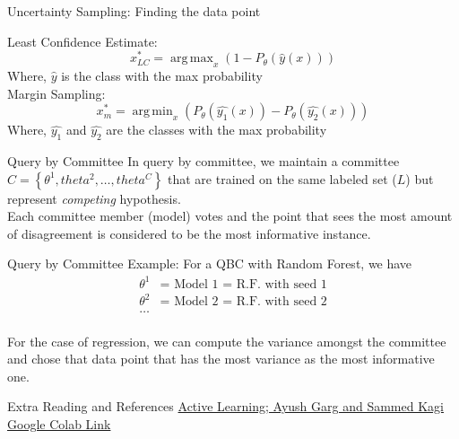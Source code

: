\documentclass{beamer}
\DeclareMathOperator*{\argmin}{arg\,min}
\DeclareMathOperator*{\argmax}{arg\,max}
\begin{document}
\begin{frame}{Uncertainty Sampling: Finding the data point}

Least Confidence Estimate: 
$$
x_{LC}^* = \argmax_{x} \left(1 - P_\theta\left(\hat{y}\left(x\right)\right)\right)
$$
Where, $\hat{y}$ is the class with the max probability
\pause
\bigskip \\
Margin Sampling:
$$
x_{m}^* = \argmin_{x}  \left(P_\theta\left(\hat{y_1}\left(x\right)\right) - P_\theta\left(\hat{y_2}\left(x\right)\right)\right)
$$
Where, $\hat{y_1}$ and $\hat{y_2}$ are the classes with the max probability
\end{frame}

\begin{frame}{Query by Committee}
In query by committee, we maintain a committee $C = \left\lbrace \theta^1, theta^2, \ldots , theta^C \right\rbrace$ that are trained on the same labeled set ($L$) but represent \emph{competing} hypothesis.
\pause \\ \bigskip
Each committee member (model) votes and the point that sees the most amount of disagreement is considered to be the most informative instance. 
\end{frame}

\begin{frame}{Query by Committee}
Example: For a QBC with Random Forest, we have 
\begin{align*}
\theta^1 &= \text{ Model 1 = R.F. with seed 1} \\
\theta^2 &= \text{ Model 2 = R.F. with seed 2} \\
\ldots
\end{align*}
\pause
\\ \bigskip
For the case of regression, we can compute the variance amongst the committee and chose that data point that has the most variance as the most informative one.
\end{frame}

\begin{frame}{Extra Reading and References}
\href{https://sammed98.github.io/Distil_Pub_Article/}{Active Learning; Ayush Garg and Sammed Kagi} \\ \bigskip
\href{https://colab.research.google.com/drive/1HMPn0mpMAe4XFe5Zvh4oExgi5evkgjTi}{Google Colab Link}
\end{frame}
\end{document}
